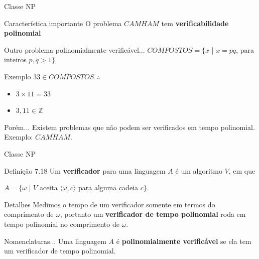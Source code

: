 \documentclass[xcolor=dvipsnames,table]{beamer}
\begin{document}
	\begin{frame}[shrink]{Classe NP}
		\begin{block}{Característica importante}
			O problema $CAMHAM$ tem {\bf verificabilidade polinomial}
		\end{block} 
		\begin{block}{Outro problema polinomialmente verificável...}
			$COMPOSTOS = \{ x$ | $x = pq$, para inteiros $p,q > 1 \}$
		\end{block} 
		\begin{exampleblock}{Exemplo}
			$33 \in COMPOSTOS$ $\therefore$ 
			\begin{itemize}
				\item $3 \times 11 = 33$
				\item $3, 11 \in \mathbb{Z}$
			\end{itemize}
		\end{exampleblock} 
		\begin{alertblock}{Porém...}
			Existem problemas que não podem ser verificados em tempo polinomial. Exemplo: $\overline{CAMHAM}$.
		\end{alertblock}
	\end{frame}
	
	\begin{frame}{Classe NP}
		\begin{block}{Definição 7.18}
			Um {\bf verificador} para uma linguagem $A$ é um algoritmo $V$, em que
			\begin{center}
				$A = \{ \omega$ | $V$ aceita $\langle \omega, c \rangle$ para alguma cadeia $c \}$.
			\end{center}
		\end{block} 
		\begin{block}{Detalhes}
			Medimos o tempo de um verificador somente em termos do comprimento de $\omega$, portanto um {\bf verificador de tempo polinomial} roda em tempo polinomial no comprimento de $\omega$. 
		\end{block} 
		\begin{block}{Nomenclaturas...}
			Uma linguagem $A$ é {\bf polinomialmente verificável} se ela tem um verificador de tempo polinomial.
		\end{block}
	\end{frame}		
	
\end{document}
